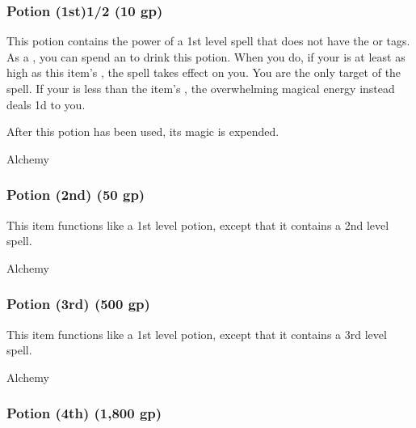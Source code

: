 
\lowercase{\hypertarget{item:Potion (1st)}{}}\label{item:Potion (1st)}
\hypertarget{item:Potion (1st)}{\subsubsection{Potion (1st)\hfill1/2 (10 gp)}}

This potion contains the power of a 1st level  spell that does not have the  or  tags.
As a , you can spend an  to drink this potion.
When you do, if your  is at least as high as this item's , the spell takes effect on you.
You are the only target of the spell.
If your  is less than the item's , the overwhelming magical energy instead deals  \minus1d to you.

After this potion has been used, its magic is expended.



 Alchemy


\lowercase{\hypertarget{item:Potion (2nd)}{}}\label{item:Potion (2nd)}
\hypertarget{item:Potion (2nd)}{\subsubsection{Potion (2nd)\hfill{} (50 gp)}}

This item functions like a 1st level potion, except that it contains a 2nd level spell.



 Alchemy


\lowercase{\hypertarget{item:Potion (3rd)}{}}\label{item:Potion (3rd)}
\hypertarget{item:Potion (3rd)}{\subsubsection{Potion (3rd)\hfill{} (500 gp)}}

This item functions like a 1st level potion, except that it contains a 3rd level spell.



 Alchemy


\lowercase{\hypertarget{item:Potion (4th)}{}}\label{item:Potion (4th)}
\hypertarget{item:Potion (4th)}{\subsubsection{Potion (4th)\hfill{} (1,800 gp)}}

